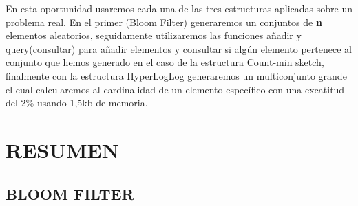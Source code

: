 \documentclass[journal]{IEEEtran}
\begin{document}
En esta oportunidad usaremos cada una de las tres estructuras aplicadas sobre un problema real. En el primer (Bloom Filter) generaremos un conjuntos de \textbf{n} elementos aleatorios, seguidamente utilizaremos las funciones añadir y query(consultar) para añadir elementos y consultar si algún elemento pertenece al conjunto que hemos generado en el caso de la estructura Count-min sketch, finalmente con la estructura HyperLogLog generaremos un multiconjunto grande el cual calcularemos al cardinalidad de un elemento específico con una excatitud del 2\% usando 1,5kb de memoria.

\section{RESUMEN}
\subsection{BLOOM FILTER}
\end{document}
